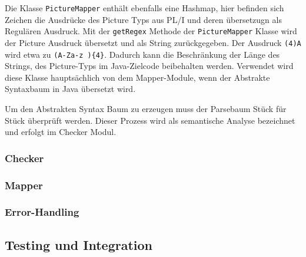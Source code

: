 Die Klasse \verb+PictureMapper+ enthält ebenfalls eine Hashmap, hier befinden sich Zeichen die Ausdrücke des Picture Typs aus PL/I und deren übersetzugn als Regulären Ausdruck. 
Mit der \verb+getRegex+ Methode der \verb+PictureMapper+ Klasse wird der Picture Ausdruck übersetzt und als String zurückgegeben.
Der Ausdruck \verb+(4)A+ wird etwa zu \verb+(A-Za-z ){4}+. Dadurch kann die Beschränkung der Länge des Strings, des Picture-Typs im Java-Zielcode beibehalten werden. 
Verwendet wird diese Klasse hauptsächlich von dem Mapper-Module, wenn der Abstrakte Syntaxbaum in Java übersetzt wird.

Um den Abstrakten Syntax Baum zu erzeugen muss der Parsebaum Stück für Stück überprüft werden. Dieser Prozess wird als semantische Analyse bezeichnet und erfolgt im Checker Modul. 
\subsubsection{Checker}
\subsubsection{Mapper}
\subsubsection{Error-Handling}

\subsection{Testing und Integration}





